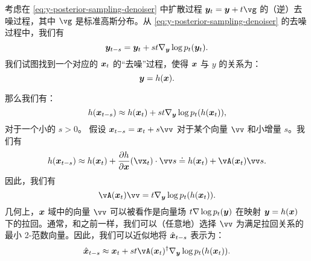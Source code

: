 \documentclass[../../book-main.tex]{subfiles}
\begin{document}
考虑在 \eqref{eq:y-posterior-sampling-denoiser} 中扩散过程 $\y_t = \y + t\vg $ 的（逆）去噪过程，其中 $\vg$ 是标准高斯分布。从 \eqref{eq:y-posterior-sampling-denoiser} 的去噪过程中，我们有
\begin{equation}
    \bm{y}_{t-s} =  \bm{y}_t + st \nabla_{\bm{y}} \log p_t(\bm{y}_t).
\end{equation}
我们试图找到一个对应的 $\bm{x}_t$ 的“去噪”过程，使得 $\bm{x}$ 与 $y$ 的关系为：
\begin{equation}
    \bm{y} =  h(\bm{x}).
\end{equation}

那么我们有：
\begin{equation}
    h(\bm{x}_{t-s}) \approx  h(\bm{x}_t) + st \nabla_{\bm{y}} \log p_t(h(\bm{x}_t)),
\end{equation}
对于一个小的 $s >0$。
假设 $\x_{t-s} = \x_t + s \vv$ 对于某个向量 $\vv$ 和小增量 $s$。我们有
\begin{equation}
    h(\x_{t-s}) \approx h(\x_t) + \frac{\partial h}{\partial \x}(\vx_{t}) \cdot \vv s \doteq h(\x_t) + \vA(\x_t) \vv s. 
\end{equation}
因此，我们有
\begin{equation}
    \vA(\x_t) \vv = t \nabla_{\y} \log p_t(h(\x_t)).
    \label{eqn:pushforward}
\end{equation}
几何上，$\bm{x}$ 域中的向量 $\vv$ 可以被看作是向量场 $t \nabla \log p_t(\bm{y})$ 在映射 $\bm{y} = h(\bm{x})$ 下的拉回。通常，和之前一样，我们可以（任意地）选择 $\vv$ 为满足拉回关系的最小 2-范数向量。因此，我们可以近似地将 $\hat{\bm{x}}_{t-s}$ 表示为：
\begin{equation}
    \hat{\x}_{t-s} \approx \x_t + st\vA(\x_t)^\dagger \nabla_{\y} \log p_t(h(\x_t)). 
\label{eqn:pullback-denoise}
\end{equation}
\end{document}
